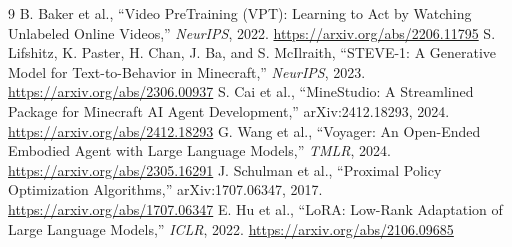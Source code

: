 \documentclass[10pt,twocolumn]{article}
\begin{document}
\begin{thebibliography}{9}
 B. Baker et al., ``Video PreTraining (VPT): Learning to Act by Watching Unlabeled Online Videos,'' \emph{NeurIPS}, 2022. \url{https://arxiv.org/abs/2206.11795}
 S. Lifshitz, K. Paster, H. Chan, J. Ba, and S. McIlraith, ``STEVE-1: A Generative Model for Text-to-Behavior in Minecraft,'' \emph{NeurIPS}, 2023. \url{https://arxiv.org/abs/2306.00937}
 S. Cai et al., ``MineStudio: A Streamlined Package for Minecraft AI Agent Development,'' arXiv:2412.18293, 2024. \url{https://arxiv.org/abs/2412.18293}
 G. Wang et al., ``Voyager: An Open-Ended Embodied Agent with Large Language Models,'' \emph{TMLR}, 2024. \url{https://arxiv.org/abs/2305.16291}
 J. Schulman et al., ``Proximal Policy Optimization Algorithms,'' arXiv:1707.06347, 2017. \url{https://arxiv.org/abs/1707.06347}
 E. Hu et al., ``LoRA: Low-Rank Adaptation of Large Language Models,'' \emph{ICLR}, 2022. \url{https://arxiv.org/abs/2106.09685}
\end{thebibliography}
\end{document}
